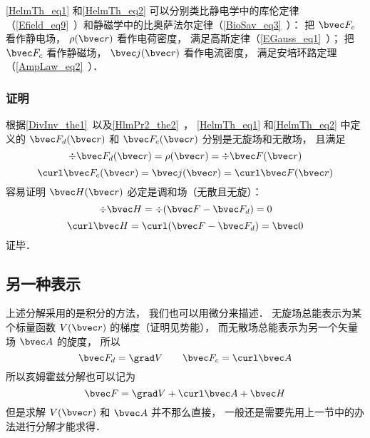 \autoref{HelmTh_eq1} 和\autoref{HelmTh_eq2} 可以分别类比静电学中的库伦定律（\autoref{Efield_eq9}~）和静磁学中的比奥萨法尔定律（\autoref{BioSav_eq3}~）： 把 $\bvec F_c$ 看作静电场， $\rho(\bvec r)$ 看作电荷密度， 满足高斯定律（\autoref{EGauss_eq1}~）； 把 $\bvec F_c$ 看作静磁场， $\bvec j(\bvec r)$ 看作电流密度， 满足安培环路定理（\autoref{AmpLaw_eq2}~）．

\subsubsection{证明}
根据\autoref{DivInv_the1}~以及\autoref{HlmPr2_the2}~， \autoref{HelmTh_eq1} 和\autoref{HelmTh_eq2} 中定义的 $\bvec F_{d}(\bvec r)$ 和 $\bvec F_{c}(\bvec r)$ 分别是无旋场和无散场， 且满足
\begin{equation}
\div \bvec F_d(\bvec r) = \rho(\bvec r) = \div \bvec F(\bvec r)
\end{equation}
\begin{equation}
\curl \bvec F_c(\bvec r) = \bvec j(\bvec r) = \curl \bvec F(\bvec r)
\end{equation}
容易证明 $\bvec H(\bvec r)$ 必定是调和场（无散且无旋）：
\begin{equation}
\div \bvec H = \div (\bvec F - \bvec F_d) = 0
\end{equation}
\begin{equation}
\curl \bvec H = \curl (\bvec F - \bvec F_d) = \bvec 0
\end{equation}
证毕．

\subsection{另一种表示}
上述分解采用的是积分的方法， 我们也可以用微分来描述． 无旋场总能表示为某个标量函数 $V(\bvec r)$ 的梯度（证明见势能）， 而无散场总能表示为另一个矢量场 $\bvec A$ 的旋度， 所以
\begin{equation}
\bvec F_{d} = \grad V\qquad \bvec F_{c} = \curl \bvec A
\end{equation}
所以亥姆霍兹分解也可以记为
\begin{equation}
\bvec F = \grad V + \curl \bvec A + \bvec H
\end{equation}
但是求解 $V(\bvec r)$ 和 $\bvec A$ 并不那么直接， 一般还是需要先用上一节中的办法进行分解才能求得．
